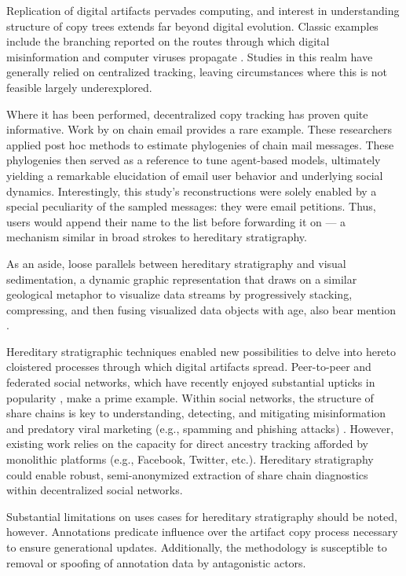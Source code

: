 Replication of digital artifacts pervades computing, and interest in understanding structure of copy trees extends far beyond digital evolution.
Classic examples include the branching reported on the routes through which digital misinformation and computer viruses propagate \citep{friggeri2014rumor,cohen1987computer}.
Studies in this realm have generally relied on centralized tracking, leaving
circumstances where this is not feasible largely underexplored.

Where it has been performed, decentralized copy tracking has proven quite informative.
Work by \cite{libennowell2008tracing} on chain email provides a rare example.
These researchers applied post hoc methods to estimate phylogenies of chain mail messages.
These phylogenies then served as a reference to tune agent-based models, ultimately yielding a remarkable elucidation of email user behavior and underlying social dynamics.
Interestingly, this study's reconstructions were solely enabled by a special peculiarity of the sampled messages: they were email petitions.
Thus, users would append their name to the list before forwarding it on --- a mechanism similar in broad strokes to hereditary stratigraphy.

As an aside, loose parallels between hereditary stratigraphy and visual sedimentation, a dynamic graphic representation that draws on a similar geological metaphor to visualize data streams by progressively stacking, compressing, and then fusing visualized data objects with age, also bear mention \citep{huron2013visual}.

Hereditary stratigraphic techniques enabled new possibilities to delve into hereto cloistered processes through which digital artifacts spread.
Peer-to-peer and federated social networks, which have recently enjoyed substantial upticks in popularity \citep{la2021understanding}, make a prime example.
Within social networks, the structure of share chains is key to understanding, detecting, and mitigating misinformation \citep{kucharski2016study,raponi2022fake} and predatory viral marketing (e.g., spamming and phishing attacks) \citep{guidi2018managing}.
However, existing work relies on the capacity for direct ancestry tracking afforded by monolithic platforms (e.g., Facebook, Twitter, etc.).
Hereditary stratigraphy could enable robust, semi-anonymized extraction of share chain diagnostics within decentralized social networks.

Substantial limitations on uses cases for hereditary stratigraphy should be noted, however.
Annotations predicate influence over the artifact copy process necessary to ensure generational updates.
Additionally, the methodology is susceptible to removal or spoofing of annotation data by antagonistic actors.
